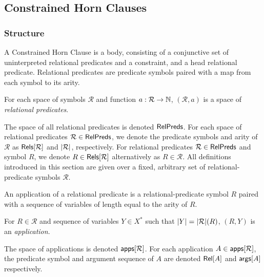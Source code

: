 
\subsection{Constrained Horn Clauses}
\label{sec:chcs}

\subsubsection{Structure}
A Constrained Horn Clause is a body, consisting of a conjunctive set
of uninterpreted relational predicates and a constraint, and a head
relational predicate.
%
Relational predicates are predicate symbols paired with a map from
each symbol to its arity.
%
\begin{defn}
  \label{defn:rel-preds}
  For each space of symbols $\mathcal{R}$ and function $a: \mathcal{R}
  \to \mathbb{N}$, $(\mathcal{R}, a)$ is a space of \emph{relational
    predicates}.
\end{defn}
%
The space of all relational predicates is denoted $\mathsf{RelPreds}$.
%
For each space of relational predicates $\mathcal{R} \in \mathsf{RelPreds}$,
we denote the predicate symbols and arity of $\mathcal{R}$ as
$\mathsf{Rels}[ \mathcal{R} ]$ and $|\mathcal{R}|$, respectively.
%
For relational predicates $\mathcal{R} \in \mathsf{RelPreds}$ and symbol $R$,
we denote $R \in \mathsf{Rels}[  \mathcal{R}  ]$ alternatively as $R \in
\mathcal{R}$.
%
All definitions introduced in this section are given over a fixed,
arbitrary set of relational-predicate symbols $\mathcal{R}$.

An application of a relational predicate is a relational-predicate
symbol $R$ paired with a sequence of variables of length equal to the
arity of $R$.
%
\begin{defn}
  \label{defn:pred-apps}
  For $R \in \mathcal{R}$ and sequence of variables $Y \in X^{*}$ such
  that $|Y| = |\mathcal{R}|(R)$, $(R, Y)$ is an
  \emph{application}.
\end{defn}
%
The space of applications is denoted $\mathsf{apps}[ \mathcal{R} ]$.
%
For each application $A \in \mathsf{apps}[ \mathcal{R} ]$, the predicate symbol
and argument sequence of $A$ are denoted $\mathsf{Rel}[ A ]$ and $\mathsf{args}[ A ]$
respectively.

